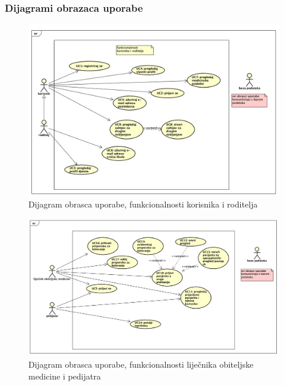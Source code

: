     
				\subsubsection{Dijagrami obrazaca uporabe}
					
					\begin{figure}[H]
						\includegraphics[width=\textwidth]{slike/uc_korisnik.png} 
						\caption{Dijagram obrasca uporabe, funkcionalnosti korisnika i roditelja}
						\label{fig:promjene2} 
					\end{figure}
					\begin{figure}[H]
						\includegraphics[width=\textwidth]{slike/uc_dr.png} 
						\caption{Dijagram obrasca uporabe, funkcionalnosti liječnika obiteljske medicine i pedijatra}
						\label{fig:promjene2} 
					\end{figure}
